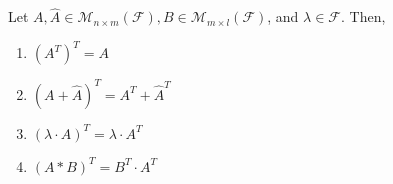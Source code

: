 \begin{lemma}\label{lemma-transpose-matrices}
	Let $A,\hat{A}\in\mathcal{M}_{n\times m}(\mathcal{F}), B\in\mathcal{M}_{m\times l}(\mathcal{F})$,
	and $\lambda\in\mathcal{F}$. Then,
	\begin{enumerate}
		\item $(A^T)^T = A$
		\item $(A + \hat{A})^T = A^T + \hat{A}^T$
		\item $(\lambda \cdot A)^T = \lambda \cdot A^T$
		\item $(A * B)^T = B^T \cdot A^T$
	\end{enumerate}
\end{lemma}
